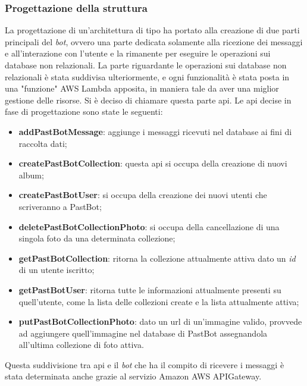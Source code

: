 \subsubsection{Progettazione della struttura }
\label{prj:serverless:api}
La progettazione di un'architettura di tipo  ha
portato alla creazione di due parti principali del \textit{bot}, ovvero una
parte dedicata solamente alla ricezione dei messaggi e all'interazione con
l'utente e la rimanente per eseguire le operazioni sui database non relazionali.
La parte riguardante le operazioni sui database non relazionali è stata
suddivisa ulteriormente, e ogni funzionalità è stata posta in una "funzione"
AWS Lambda apposita, in maniera tale da aver una miglior gestione delle
risorse. Si è deciso di chiamare questa parte \gls{api}. Le \gls{api} decise in
fase di progettazione sono state le seguenti:
\begin{itemize}
  \item \textbf{addPastBotMessage}: aggiunge i messaggi ricevuti nel database
ai fini di raccolta dati;

  \item \textbf{createPastBotCollection}: questa \gls{api} si occupa della
creazione di nuovi album;

  \item \textbf{createPastBotUser}: si occupa della creazione dei nuovi utenti
che scriveranno a PastBot;

  \item \textbf{deletePastBotCollectionPhoto}: si occupa della cancellazione di
una singola foto da una determinata collezione;

  \item \textbf{getPastBotCollection}: ritorna la collezione attualmente attiva
dato un \textit{id} di un utente iscritto;

  \item \textbf{getPastBotUser}: ritorna tutte le informazioni attualmente
presenti su quell'utente, come la lista delle collezioni create e la lista
attualmente attiva;

  \item \textbf{putPastBotCollectionPhoto}: dato un \gls{url} di un'immagine
valido, provvede ad aggiungere quell'immagine nel database di PastBot
assegnandola all'ultima collezione di foto attiva.
\end{itemize}

Questa suddivisione tra \gls{api} e il \textit{bot} che ha il compito di
ricevere i messaggi è stata determinata anche grazie al servizio Amazon AWS
APIGateway.

